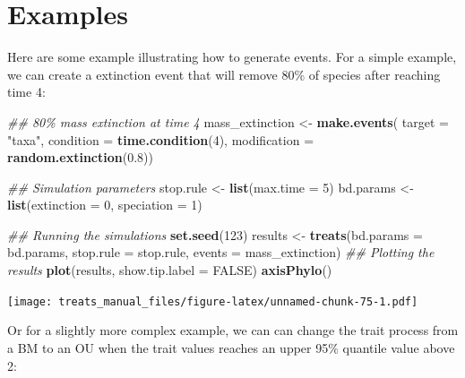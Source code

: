 \documentclass[
]{book}
\newenvironment{Shaded}{\begin{snugshade}}{\end{snugshade}}
\newcommand{\CommentTok}[1]{\textcolor[rgb]{0.56,0.35,0.01}{\textit{#1}}}
\newcommand{\DataTypeTok}[1]{\textcolor[rgb]{0.13,0.29,0.53}{#1}}
\newcommand{\DecValTok}[1]{\textcolor[rgb]{0.00,0.00,0.81}{#1}}
\newcommand{\FloatTok}[1]{\textcolor[rgb]{0.00,0.00,0.81}{#1}}
\newcommand{\KeywordTok}[1]{\textcolor[rgb]{0.13,0.29,0.53}{\textbf{#1}}}
\newcommand{\NormalTok}[1]{#1}
\newcommand{\OtherTok}[1]{\textcolor[rgb]{0.56,0.35,0.01}{#1}}
\newcommand{\StringTok}[1]{\textcolor[rgb]{0.31,0.60,0.02}{#1}}
\begin{document}
\hypertarget{examples}{%
\section{Examples}\label{examples}}

Here are some example illustrating how to generate events.
For a simple example, we can create a extinction event that will remove 80\% of species after reaching time 4:

\begin{Shaded}
\begin{Highlighting}[]
\CommentTok{\#\# 80\% mass extinction at time 4}
\NormalTok{mass\_extinction \textless{}{-}}\StringTok{ }\KeywordTok{make.events}\NormalTok{(}
                      \DataTypeTok{target       =} \StringTok{"taxa"}\NormalTok{,}
                      \DataTypeTok{condition    =} \KeywordTok{time.condition}\NormalTok{(}\DecValTok{4}\NormalTok{),}
                      \DataTypeTok{modification =} \KeywordTok{random.extinction}\NormalTok{(}\FloatTok{0.8}\NormalTok{))}

\CommentTok{\#\# Simulation parameters}
\NormalTok{stop.rule \textless{}{-}}\StringTok{ }\KeywordTok{list}\NormalTok{(}\DataTypeTok{max.time =} \DecValTok{5}\NormalTok{)}
\NormalTok{bd.params \textless{}{-}}\StringTok{ }\KeywordTok{list}\NormalTok{(}\DataTypeTok{extinction =} \DecValTok{0}\NormalTok{, }\DataTypeTok{speciation =} \DecValTok{1}\NormalTok{)}

\CommentTok{\#\# Running the simulations}
\KeywordTok{set.seed}\NormalTok{(}\DecValTok{123}\NormalTok{)}
\NormalTok{results \textless{}{-}}\StringTok{ }\KeywordTok{treats}\NormalTok{(}\DataTypeTok{bd.params =}\NormalTok{ bd.params,}
                \DataTypeTok{stop.rule =}\NormalTok{ stop.rule,}
                \DataTypeTok{events    =}\NormalTok{ mass\_extinction)}
\CommentTok{\#\# Plotting the results}
\KeywordTok{plot}\NormalTok{(results, }\DataTypeTok{show.tip.label =} \OtherTok{FALSE}\NormalTok{)}
\KeywordTok{axisPhylo}\NormalTok{()}
\end{Highlighting}
\end{Shaded}

\texttt{[image: treats\_manual\_files/figure-latex/unnamed-chunk-75-1.pdf]}

Or for a slightly more complex example, we can can change the trait process from a BM to an OU when the trait values reaches an upper 95\% quantile value above 2:
\end{document}
